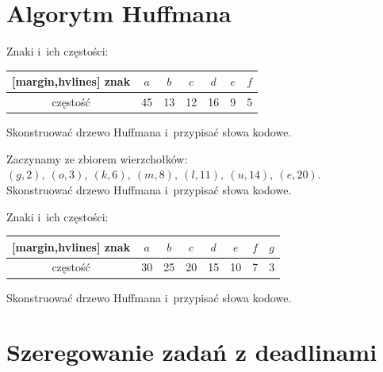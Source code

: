 \section{Algorytm Huffmana}

\begin{example}
	Znaki i~ich częstości:
	\begin{aztable}
		\centering
		\renewcommand{\arraystretch}{1.2}
		\begin{NiceTabular}{c|cccccc}[margin,hvlines]
			znak     & $a$ & $b$ & $c$ & $d$ & $e$ & $f$ \\
			\hline
			częstość & 45  & 13  & 12  & 16  & 9   & 5
		\end{NiceTabular}
	\end{aztable}
	Skonstruować drzewo Huffmana i~przypisać słowa kodowe.
\end{example}

\begin{example}
	Zaczynamy ze zbiorem wierzchołków:
	$(g, 2),\ (o, 3),\ (k, 6),\ (m, 8),\ (l, 11),\ (u, 14),\ (e, 20)$.\\
	Skonstruować drzewo Huffmana i~przypisać słowa kodowe.
\end{example}

	\begin{example}
		Znaki i~ich częstości:
		\begin{aztable}
			\centering
			\renewcommand{\arraystretch}{1.2}
			\begin{NiceTabular}{c|ccccccc}[margin,hvlines]
				znak     & $a$ & $b$ & $c$ & $d$ & $e$ & $f$ & $g$ \\
				\hline
				częstość & 30  & 25  & 20  & 15  & 10  & 7   & 3
			\end{NiceTabular}
		\end{aztable}
		Skonstruować drzewo Huffmana i~przypisać słowa kodowe.
	\end{example}

\section{Szeregowanie zadań z deadlinami}

